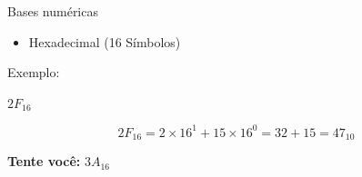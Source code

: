 

\begin{frame}{Bases numéricas}
    \begin{itemize}
        \item Hexadecimal (16 Símbolos)
    \end{itemize}

    \vspace{0.5cm}

    Exemplo:

    \begin{center}
        $2F_{16}$
    \end{center}

    \[
        2F_{16}
        = 2 \times 16^{1}
        + 15 \times 16^{0}
        = 32 + 15
        = 47_{10}
    \]

    \vspace{0.5cm}

    \textbf{Tente você:} $3A_{16}$
\end{frame}